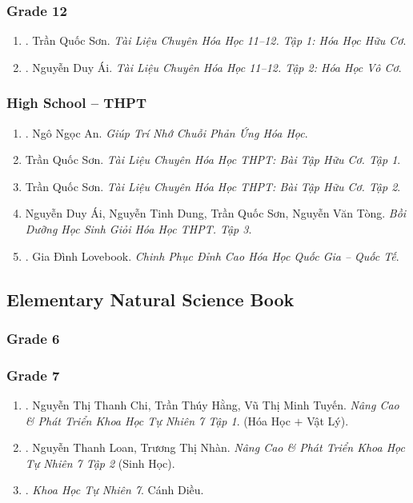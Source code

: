 \documentclass{article}
\begin{document}
\subsubsection{Grade 12}

\begin{enumerate}	
	\item \cite{Son2021}. Trần Quốc Sơn. \textit{Tài Liệu Chuyên Hóa Học 11--12. Tập 1: Hóa Học Hữu Cơ}.\hfill{\sf[bought]}
	\item \cite{Ai2022}. Nguyễn Duy Ái. \textit{Tài Liệu Chuyên Hóa Học 11--12. Tập 2: Hóa Học Vô Cơ}.\hfill{\sf[bought]}
\end{enumerate}

\subsubsection{High School -- THPT}

\begin{enumerate}
	\item \cite{An_chuoi_PUHH}. Ngô Ngọc An. \textit{Giúp Trí Nhớ Chuỗi Phản Ứng Hóa Học}.\hfill{}
	\item Trần Quốc Sơn. \textit{Tài Liệu Chuyên Hóa Học THPT: Bài Tập Hữu Cơ. Tập 1}.
	\item Trần Quốc Sơn. \textit{Tài Liệu Chuyên Hóa Học THPT: Bài Tập Hữu Cơ. Tập 2}.
	\item Nguyễn Duy Ái, Nguyễn Tinh Dung, Trần Quốc Sơn, Nguyễn Văn Tòng. \textit{Bồi Dưỡng Học Sinh Giỏi Hóa Học THPT. Tập 3}.
	\item \cite{Lovebook2022}. Gia Đình Lovebook. \textit{Chinh Phục Đỉnh Cao Hóa Học Quốc Gia -- Quốc Tế}.\hfill{\sf[bought]}
\end{enumerate}

\subsection{Elementary Natural Science Book}

\subsubsection{Grade 6}

\subsubsection{Grade 7}

\begin{enumerate}
	\item \cite{Chi_Hang_Tuyen2022}. Nguyễn Thị Thanh Chi, Trần Thúy Hằng, Vũ Thị Minh Tuyến. \textit{Nâng Cao \& Phát Triển Khoa Học Tự Nhiên 7 Tập 1}. (Hóa Học $+$ Vật Lý).\hfill{\sf[bought]}
	\item \cite{Loan_Nhan2022}. Nguyễn Thanh Loan, Trương Thị Nhàn. \textit{Nâng Cao \& Phát Triển Khoa Học Tự Nhiên 7 Tập 2} (Sinh Học).\hfill{\sf[bought]}
	\item \cite{SGK_KHTN_7_Canh_Dieu}. \textit{Khoa Học Tự Nhiên 7}. Cánh Diều.\hfill{}
\end{enumerate}
\end{document}

